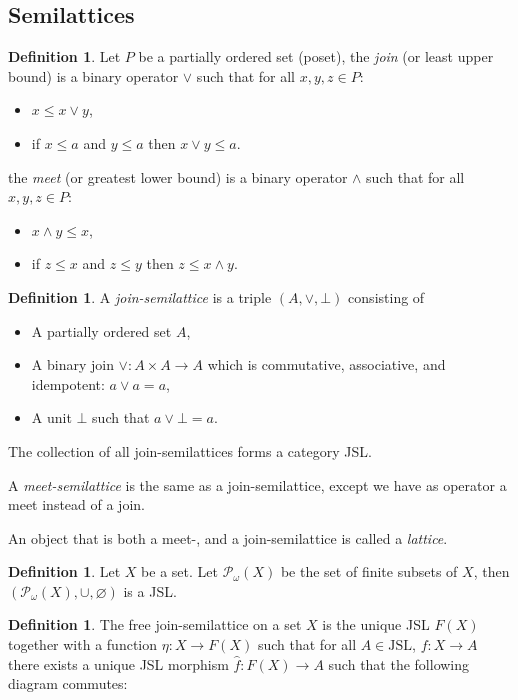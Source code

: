 \documentclass[12pt]{article}
\theoremstyle{definition}
\newtheorem{definition}[theorem]{Definition}
\newcommand{\1}{\mathbbm{1}}
\newcommand{\finP}{\mathcal{P}_{\omega}}
\newcommand{\JSL}{\text{JSL}}
\begin{document}
\subsection{Semilattices}
\begin{definition}
    Let $P$ be a partially ordered set (poset), the \emph{join} (or least upper bound) is a binary operator $\vee$ such that for all $x,y,z\in P$:
    \begin{itemize}
        \item $x\leq x\vee y$,
        \item if $x\leq a$ and $y\leq a$ then $x\vee y\leq a$.
    \end{itemize}

    the \emph{meet} (or greatest lower bound) is a binary operator $\wedge$ such that for all $x,y,z\in P$:
        \begin{itemize}
        \item $x\wedge y\leq x$,
        \item if $z\leq x$ and $z\leq y$ then $z\leq x\wedge y$.
    \end{itemize}
\end{definition}

\begin{definition}
    A \emph{join-semilattice} is a triple $(A, \vee, \bot)$ consisting of
    \begin{itemize}
        \item A partially ordered set $A$,
        \item A binary join $\vee: A\times A \to A$ which is commutative, associative, and idempotent: $a\vee a = a$,
        \item A unit $\bot$ such that $a \vee\bot = a$.
    \end{itemize}

    The collection of all join-semilattices forms a category JSL.

    A \emph{meet-semilattice} is the same as a join-semilattice, except we have as operator a meet instead of a join.

    An object that is both a meet-, and a join-semilattice is called a \emph{lattice}. 
\end{definition}

\begin{definition}
    Let $X$ be a set. Let $\finP(X)$ be the set of finite subsets of $X$, then $(\finP(X), \cup, \varnothing)$ is a JSL.
\end{definition}

\begin{definition}
    The free join-semilattice on a set $X$ is the unique JSL $F(X)$ together with a function $\eta: X\to F(X)$ such that for all $A\in\JSL$, $f: X \to A$ there exists a unique JSL morphism $\hat{f}: F(X)\to A$ such that the following diagram commutes:
    \begin{center}
    \end{center}
\end{definition}
\end{document}
